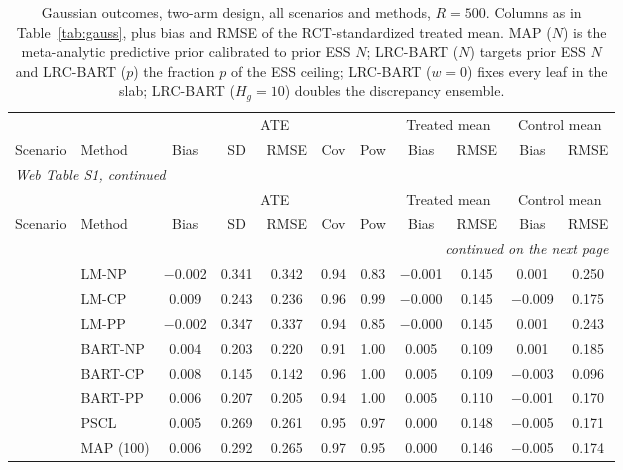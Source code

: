 \begin{center}
\scriptsize
\setlength{\tabcolsep}{3.5pt}
\renewcommand{\arraystretch}{0.8}
\begin{longtable}{llccccccccc}
\caption{Gaussian outcomes, two-arm design, all scenarios and methods, $R=500$. Columns as in Table~\ref{tab:gauss}, plus bias and RMSE of the RCT-standardized treated mean. MAP ($N$) is the meta-analytic predictive prior calibrated to prior ESS $N$; LRC-BART ($N$) targets prior ESS $N$ and LRC-BART ($p$) the fraction $p$ of the ESS ceiling; LRC-BART ($w=0$) fixes every leaf in the slab; LRC-BART ($H_g=10$) doubles the discrepancy ensemble.}\label{tab:gauss_full}\\
\toprule
& & \multicolumn{5}{c}{ATE} & \multicolumn{2}{c}{Treated mean} & \multicolumn{2}{c}{Control mean} \\
\cmidrule(lr){3-7}\cmidrule(lr){8-9}\cmidrule(lr){10-11}
Scenario & Method & Bias & SD & RMSE & Cov & Pow & Bias & RMSE & Bias & RMSE \\
\midrule
\endfirsthead
\multicolumn{11}{l}{\textit{Web Table S1, continued}}\\
\toprule
& & \multicolumn{5}{c}{ATE} & \multicolumn{2}{c}{Treated mean} & \multicolumn{2}{c}{Control mean} \\
\cmidrule(lr){3-7}\cmidrule(lr){8-9}\cmidrule(lr){10-11}
Scenario & Method & Bias & SD & RMSE & Cov & Pow & Bias & RMSE & Bias & RMSE \\
\midrule
\endhead
\midrule
\multicolumn{11}{r}{\textit{continued on the next page}}\\
\endfoot
\bottomrule
\endlastfoot
\multirow{20}{*}{Sc1} & LM-NP & $-$0.002 & 0.341 & 0.342 & 0.94 & 0.83 & $-$0.001 & 0.145 & 0.001 & 0.250 \\
& LM-CP & 0.009 & 0.243 & 0.236 & 0.96 & 0.99 & $-$0.000 & 0.145 & $-$0.009 & 0.175 \\
& LM-PP & $-$0.002 & 0.347 & 0.337 & 0.94 & 0.85 & $-$0.000 & 0.145 & 0.001 & 0.243 \\
& BART-NP & 0.004 & 0.203 & 0.220 & 0.91 & 1.00 & 0.005 & 0.109 & 0.001 & 0.185 \\
& BART-CP & 0.008 & 0.145 & 0.142 & 0.96 & 1.00 & 0.005 & 0.109 & $-$0.003 & 0.096 \\
& BART-PP & 0.006 & 0.207 & 0.205 & 0.94 & 1.00 & 0.005 & 0.110 & $-$0.001 & 0.170 \\
& PSCL & 0.005 & 0.269 & 0.261 & 0.95 & 0.97 & 0.000 & 0.148 & $-$0.005 & 0.171 \\
& MAP (100) & 0.006 & 0.292 & 0.265 & 0.97 & 0.95 & 0.000 & 0.146 & $-$0.005 & 0.174 \\

\end{longtable}
\end{center}
